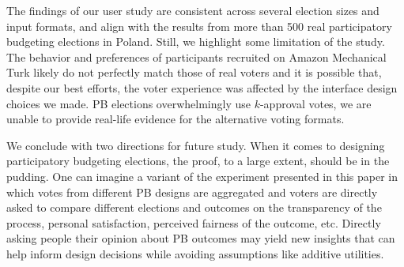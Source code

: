 \documentclass[mnsc,blindrev]{informs3_freeuse} %
\newcommand{\kibitz}[2]{\ifnum\Comments=1{\color{#1}{#2}}\fi}
\newcommand{\gb}[1]{\kibitz{red}{[GB:#1]}}
\newcommand{\mes}{ES}
\begin{document}
The findings of our user study  are consistent across several election sizes and input formats, and align with the results from more than 500 real participatory budgeting elections in Poland. Still, we highlight some limitation of the study. The  behavior and preferences of participants recruited on Amazon Mechanical Turk likely do not perfectly match those of real voters and it is possible that, despite our best efforts, the   voter experience   was affected by the interface design choices we made.   PB elections overwhelmingly use $k$-approval votes, we are unable to provide real-life evidence for the alternative voting formats. 



We conclude with  two directions for future study.  
When it comes to designing participatory budgeting elections, the proof, to a large extent, should be in the pudding.   
One can imagine a  variant of the experiment presented in this paper in which votes from different PB designs are aggregated and voters are directly asked to compare different elections and outcomes on the transparency of the process, personal satisfaction, perceived fairness of the outcome, etc. 
Directly asking people their opinion about PB outcomes may yield new  insights   that can help inform design decisions while avoiding assumptions like  additive utilities. 
\end{document}
